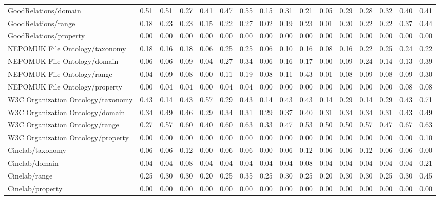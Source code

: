 \begin{tabular}{lccccccccccccccc}
GoodRelations/domain & 0.51 & 0.51 & 0.27 & 0.41 & 0.47 & 0.55 & 0.15 & 0.31 & 0.21 & 0.05 & 0.29 & 0.28 & 0.32 & 0.40 & 0.41 \\
GoodRelations/range & 0.18 & 0.23 & 0.23 & 0.15 & 0.22 & 0.27 & 0.02 & 0.19 & 0.23 & 0.01 & 0.20 & 0.22 & 0.22 & 0.37 & 0.44 \\
GoodRelations/property & 0.00 & 0.00 & 0.00 & 0.00 & 0.00 & 0.00 & 0.00 & 0.00 & 0.00 & 0.00 & 0.00 & 0.00 & 0.00 & 0.00 & 0.00 \\
NEPOMUK File Ontology/taxonomy & 0.18 & 0.16 & 0.18 & 0.06 & 0.25 & 0.25 & 0.06 & 0.10 & 0.16 & 0.08 & 0.16 & 0.22 & 0.25 & 0.24 & 0.22 \\
NEPOMUK File Ontology/domain & 0.06 & 0.06 & 0.09 & 0.04 & 0.27 & 0.34 & 0.06 & 0.16 & 0.17 & 0.00 & 0.09 & 0.24 & 0.14 & 0.13 & 0.39 \\
NEPOMUK File Ontology/range & 0.04 & 0.09 & 0.08 & 0.00 & 0.11 & 0.19 & 0.08 & 0.11 & 0.43 & 0.01 & 0.08 & 0.09 & 0.08 & 0.09 & 0.30 \\
NEPOMUK File Ontology/property & 0.00 & 0.04 & 0.04 & 0.00 & 0.04 & 0.04 & 0.00 & 0.00 & 0.00 & 0.00 & 0.00 & 0.00 & 0.00 & 0.08 & 0.08 \\
W3C Organization Ontology/taxonomy & 0.43 & 0.14 & 0.43 & 0.57 & 0.29 & 0.43 & 0.14 & 0.43 & 0.43 & 0.14 & 0.29 & 0.14 & 0.29 & 0.43 & 0.71 \\
W3C Organization Ontology/domain & 0.34 & 0.49 & 0.46 & 0.29 & 0.34 & 0.31 & 0.29 & 0.37 & 0.40 & 0.31 & 0.34 & 0.34 & 0.31 & 0.43 & 0.49 \\
W3C Organization Ontology/range & 0.27 & 0.57 & 0.60 & 0.40 & 0.60 & 0.63 & 0.33 & 0.47 & 0.53 & 0.50 & 0.50 & 0.57 & 0.47 & 0.67 & 0.63 \\
W3C Organization Ontology/property & 0.00 & 0.00 & 0.00 & 0.00 & 0.00 & 0.00 & 0.00 & 0.00 & 0.00 & 0.00 & 0.00 & 0.00 & 0.00 & 0.00 & 0.10 \\
Cinelab/taxonomy & 0.06 & 0.06 & 0.12 & 0.00 & 0.06 & 0.06 & 0.00 & 0.06 & 0.12 & 0.06 & 0.06 & 0.12 & 0.06 & 0.06 & 0.00 \\
Cinelab/domain & 0.04 & 0.04 & 0.08 & 0.04 & 0.04 & 0.04 & 0.04 & 0.04 & 0.08 & 0.04 & 0.04 & 0.04 & 0.04 & 0.04 & 0.21 \\
Cinelab/range & 0.25 & 0.30 & 0.30 & 0.20 & 0.25 & 0.35 & 0.25 & 0.30 & 0.25 & 0.20 & 0.30 & 0.30 & 0.25 & 0.30 & 0.45 \\
Cinelab/property & 0.00 & 0.00 & 0.00 & 0.00 & 0.00 & 0.00 & 0.00 & 0.00 & 0.00 & 0.00 & 0.00 & 0.00 & 0.00 & 0.00 & 0.00 \\

\end{tabular}

